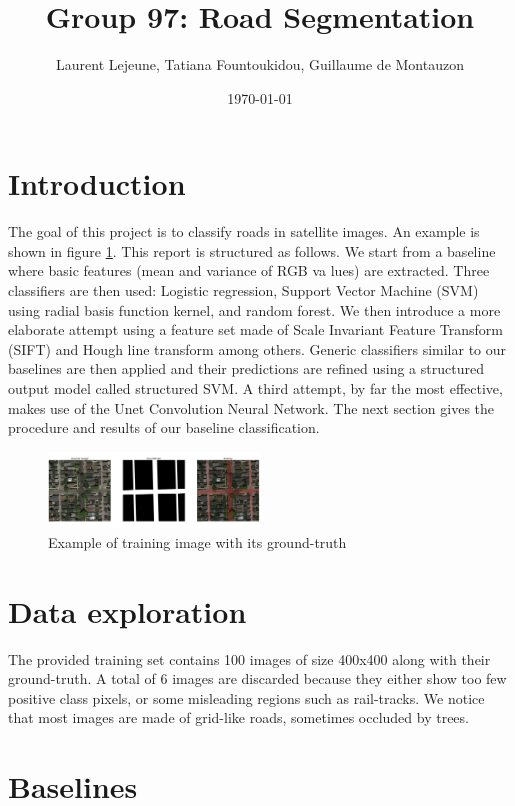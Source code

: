 \documentclass[10pt,conference,compsocconf]{IEEEtran}
\author{Laurent Lejeune, Tatiana Fountoukidou, Guillaume de Montauzon}
\date{\today}
\title{Group 97: Road Segmentation}
\begin{document}
	
	\maketitle
	
	\section{Introduction}

  The goal of this project is to classify roads in satellite images. 
	An example is shown in figure \ref{fig:example}. This report is structured as
  follows. We start from a baseline where basic features (mean and variance of
  RGB va lues) are extracted. Three classifiers are then used: Logistic
  regression, Support Vector Machine (SVM) using radial basis function kernel,
  and random forest. We then introduce a more elaborate attempt using a feature
  set made of Scale Invariant Feature Transform (SIFT) and Hough line transform
  among others. Generic classifiers similar to our baselines are then applied
  and their predictions are refined using a structured output model called
  structured SVM. A third attempt, by far the most effective, makes use of the Unet Convolution Neural Network.
  The next section gives the procedure and results of our baseline classification.
	\begin{figure}[h]
		\centering
		\includegraphics[width=0.5\textwidth]{pics/example.png}
		\caption{Example of training image with its ground-truth}
		\label{fig:example}
	\end{figure}
	
	\section{Data exploration}
	The provided training set contains 100 images of size 400x400 along with their
  ground-truth. A total of 6 images are discarded because they either show too few positive class pixels, or some misleading regions such as rail-tracks. 
	We notice that most images are made of grid-like roads, sometimes occluded by trees. 

	\section{Baselines}
\end{document}
